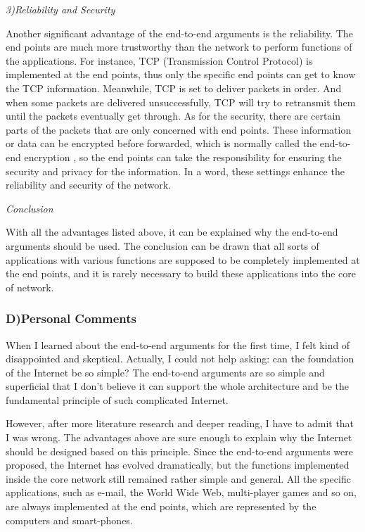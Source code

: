 \documentclass[11pt,twocolumn]{article}
\begin{document}
\emph{3)\quad Reliability and Security}

Another significant advantage of the end-to-end arguments is the reliability. The end points are much more trustworthy than the network to perform functions of the applications. For instance, TCP (Transmission Control Protocol) is implemented at the end points, thus only the specific end points can get to know the TCP information. Meanwhile, TCP is set to deliver packets in order. And when some packets are delivered unsuccessfully, TCP will try to retransmit them until the packets eventually get through. As for the security, there are certain parts of the packets that are only concerned with end points. These information or data can be encrypted before forwarded, which is normally called the end-to-end encryption \cite{e2eE}, so the end points can take the responsibility for ensuring the security and privacy for the information. In a word, these settings enhance the reliability and security of the network. 

\emph{Conclusion}

With all the advantages listed above, it can be explained why the end-to-end arguments should be used. The conclusion can be drawn that all sorts of applications with various functions are supposed to be completely implemented at the end points, and it is rarely necessary to build these applications into the core of network. 

\subsubsection*{D)\quad Personal Comments}
When I learned about the end-to-end arguments for the first time, I felt kind of disappointed and skeptical. Actually, I could not help asking: can the foundation of the Internet be so simple? The end-to-end arguments are so simple and superficial that I don't believe it can support the whole architecture and be the fundamental principle of such complicated Internet. 

However, after more literature research and deeper reading, I have to admit that I was wrong. The advantages above are sure enough to explain why the Internet should be designed based on this principle. Since the end-to-end arguments were proposed, the Internet has evolved dramatically, but the functions implemented inside the core network still remained rather simple and general. All the specific applications, such as e-mail, the World Wide Web, multi-player games and so on, are always implemented at the end points, which are represented by the computers and smart-phones.
\end{document}

